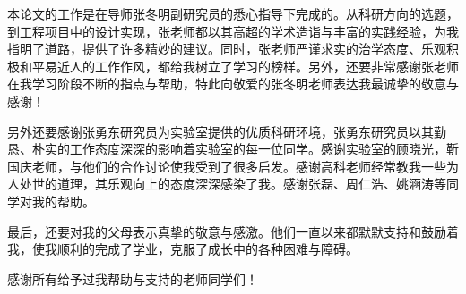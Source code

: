 
\begin{thanks}

本论文的工作是在导师张冬明副研究员的悉心指导下完成的。从科研方向的选题，到工程项目中的设计实现，张老师都以其高超的学术造诣与丰富的实践经验，为我指明了道路，提供了许多精妙的建议。同时，张老师严谨求实的治学态度、乐观积极和平易近人的工作作风，都给我树立了学习的榜样。另外，还要非常感谢张老师在我学习阶段不断的指点与帮助，特此向敬爱的张冬明老师表达我最诚挚的敬意与感谢！

另外还要感谢张勇东研究员为实验室提供的优质科研环境，张勇东研究员以其勤恳、朴实的工作态度深深的影响着实验室的每一位同学。感谢实验室的顾晓光，靳国庆老师，与他们的合作讨论使我受到了很多启发。感谢高科老师经常教我一些为人处世的道理，其乐观向上的态度深深感染了我。感谢张磊、周仁浩、姚涵涛等同学对我的帮助。

最后，还要对我的父母表示真挚的敬意与感激。他们一直以来都默默支持和鼓励着我，使我顺利的完成了学业，克服了成长中的各种困难与障碍。

感谢所有给予过我帮助与支持的老师同学们！

\end{thanks}
